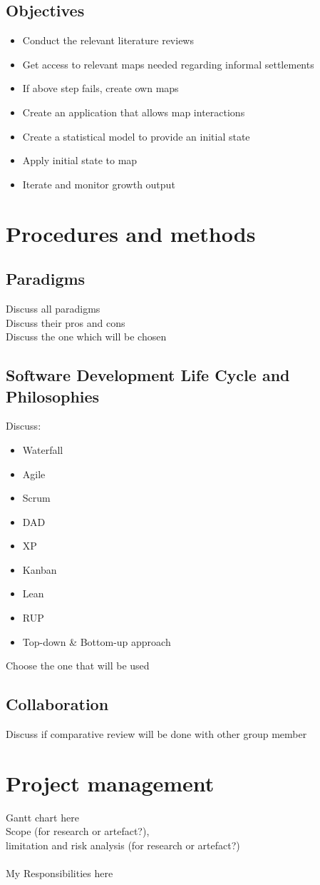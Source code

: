 \subsection{Objectives}
\begin{itemize}
\item Conduct the relevant literature reviews
\item Get access to relevant maps needed regarding informal settlements
\item If above step fails, create own maps
\item Create an application that allows map interactions
\item Create a statistical model to provide an initial state
\item Apply initial state to map
\item Iterate and monitor growth output
\end{itemize}
\section{Procedures and methods}
\subsection{Paradigms}
Discuss all paradigms\\
Discuss their pros and cons\\
Discuss the one which will be chosen
\subsection{Software Development Life Cycle and Philosophies}
Discuss:
\begin{itemize}
\item Waterfall
\item Agile
\item Scrum
\item DAD
\item XP
\item Kanban
\item Lean
\item RUP
\item Top-down \& Bottom-up approach
\end{itemize}
Choose the one that will be used
\subsection{Collaboration}
Discuss if comparative review will be done with other group member
\section{Project management}
Gantt chart here\\
Scope (for research or artefact?),\\
limitation and risk analysis (for research or artefact?)\\\\
My Responsibilities here
